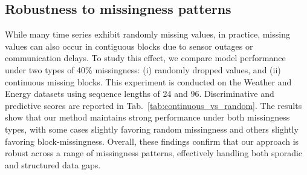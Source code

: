 \documentclass{article}
\theoremstyle{plain}
\theoremstyle{definition}
\theoremstyle{remark}
\begin{document}
\begin{table}[t]
    \centering
    \caption{Discriminative and predictive scores for 40\% random vs. 40\% continuous missingness on the Weather and Energy datasets with sequence lengths of 24 and 96. Lower is better.}
    \label{tab:continuous_vs_random}
\end{table}

\vspace{-2mm}
\subsection{Robustness to missingness patterns}
\vspace{-2mm}
While many time series exhibit randomly missing values, in practice, missing values can also occur in contiguous blocks due to sensor outages or communication delays. To study this effect, we compare model performance under two types of 40\% missingness: (i) randomly dropped values, and (ii) continuous missing blocks. This experiment is conducted on the Weather and Energy datasets using sequence lengths of 24 and 96. Discriminative and predictive scores are reported in Tab.~\ref{tab:continuous_vs_random}. The results show that our method maintains strong performance under both missingness types, with some cases slightly favoring random missingness and others slightly favoring block-missingness. Overall, these findings confirm that our approach is robust across a range of missingness patterns, effectively handling both sporadic and structured data gaps.
\end{document}
